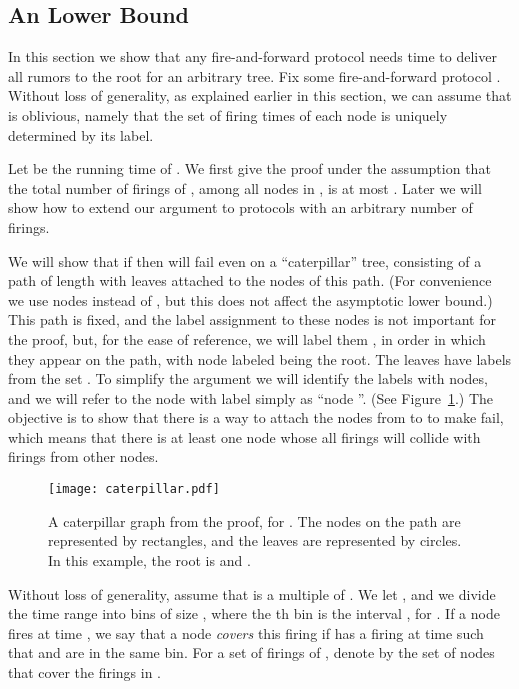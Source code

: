 \subsection{An  Lower Bound}

In this section we show that any fire-and-forward protocol needs time  to
deliver all rumors to the root for an arbitrary tree. Fix some fire-and-forward protocol
. Without loss of generality, as explained earlier in this section, we can
assume that  is oblivious, namely that the set  of firing times of each
node  is uniquely determined by its label. 

Let  be the running time of .
We first give the proof under the assumption that the total number of firings
of , among all nodes in , 
is at most . Later we will show how to extend our
argument to protocols with an arbitrary number of firings.

We will show that if  then
 will fail even on a ``caterpillar'' tree,
consisting of a path  of length  with  leaves attached to the
nodes of this path. (For convenience we use  nodes
instead of , but this does not affect the asymptotic lower bound.)
This path  is fixed, and the label assignment to these nodes is not important
for the proof, but, for the ease of reference,
we will label them , in order in which they appear on the path,
with node labeled  being the root. 
The leaves have labels from the set . 
To simplify the argument we will identify
the labels with nodes, and we will refer to the node with label  simply
as ``node ''. (See Figure~\ref{fig: caterpillar}.)
The objective is to show that there is a way to attach
the nodes from  to  to make  fail, which means that
there is at least one node  whose all firings will collide with
firings from other nodes.

\begin{figure}[ht]
\begin{center}
\texttt{[image: caterpillar.pdf]}
\caption{A caterpillar graph from the proof, for . 
The nodes on the path  are represented by 
rectangles, and the leaves are represented by circles. In this example,
the root is  and .
}
\label{fig: caterpillar}
\end{center}
\end{figure}


Without loss of generality, assume that  is a multiple of .
We let , and we divide the time range  into 
bins of size , where the th bin is the interval , for .
If a node  fires at time , we say that a node  
\emph{covers} this firing if  has a firing at time  such that  and  are
in the same bin.
For a set  of firings of , denote by 
 the set of nodes that cover the firings in .

